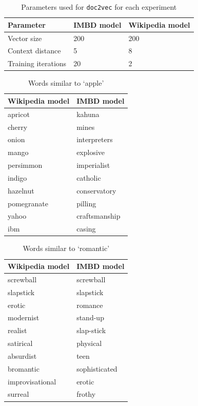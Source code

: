 \documentclass[11pt]{article}
\begin{document}
  \begin{table}[h]
    \begin{center}
      \begin{tabular}{l l l}
        Parameter & IMBD model & Wikipedia model\\
        \hline
        Vector size & 200 & 200\\
        Context distance & 5 & 8\\
        Training iterations & 20 & 2\\
      \end{tabular}
    \caption{Parameters used for \texttt{doc2vec} for each experiment}
    \label{tab:params}
    \end{center}
  \end{table}

  \begin{table}[h]
    \begin{center}
      \begin{tabular}{l l}
        Wikipedia model & IMBD model\\
        \hline
        apricot & kahuna\\
        cherry & mines\\
        onion & interpreters\\
        mango & explosive\\
        persimmon & imperialist\\
        indigo & catholic\\
        hazelnut & conservatory\\
        pomegranate & pilling\\
        yahoo & craftsmanship\\
        ibm & casing\\
      \end{tabular}
    \caption{Words similar to `apple'}
    \label{tab:apple}
    \end{center}
  \end{table}

  \begin{table}[h]
    \begin{center}
      \begin{tabular}{l l}
        Wikipedia model & IMBD model\\
        \hline
        screwball & screwball\\
        slapstick & slapstick\\
        erotic & romance\\
        modernist & stand-up\\
        realist & slap-stick\\
        satirical & physical\\
        absurdist & teen\\
        bromantic & sophisticated\\
        improvisational & erotic\\
        surreal & frothy\\
      \end{tabular}
    \caption{Words similar to `romantic'}
    \label{tab:romantic}
    \end{center}
  \end{table}
\end{document}
